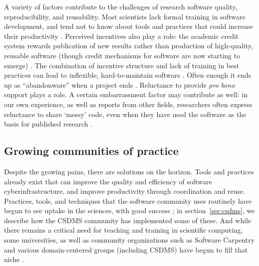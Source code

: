\documentclass[12pt]{amsart}
\begin{document}
A variety of factors contribute to the challenges of research software quality, reproducibility, and reusability. Most scientists lack formal training in software development, and tend not to know about tools and practices that could increase their productivity \citep{kelly2007software,basili2008understanding,faulk2009scientific,hannay2009scientists,hwang2017software,alnoamany2018towards,pinto2018scientists,kellogg2018role}. Perceived incentives also play a role: the academic credit system rewards publication of new results rather than production of high-quality, reusable software (though credit mechanisms for software are now starting to emerge) \citep{leveque2009python,howison2011scientific,morin2012shining,turk2013scaling,ahalt2014water,poisot2015best,hwang2017software,wiese2019naming}. The combination of incentive structure and lack of training in best practices can lead to inflexible, hard-to-maintain software \citep{brown2014run,johanson2018software}. Often enough it ends up as ``abandonware'' when a project ends \citep{barnes2010publish}. Reluctance to provide \textit{pro bono} support plays a role. A certain embarrassment factor may contribute as well: in our own experience, as well as reports from other fields, researchers often express reluctance to share `messy' code, even when they have used the software as the basis for published research \citep{barnes2010publish,morin2012shining,leveque2013top}.



\subsection{Growing communities of practice}

Despite the growing pains, there are solutions on the horizon. Tools and practices already exist that can improve the quality and efficiency of software cyberinfrastructure, and improve productivity through coordination and reuse. Practices, tools, and techniques that the software community uses routinely have begun to see uptake in the sciences, with good success \citep{bangerth2013makes,turk2013scaling,hastings2014ten,wilson2014best,brown2014run,poisot2015best,hwang2017software,nanthaamornphong2017test,scott2017esip,taschuk2017ten,wilson2017good,benureau2018re,bryan2018excuse,adorf2018professionally,lathrop2019introduction}; in section~\ref{sec:csdms}, we describe how the CSDMS community has implemented some of these. And while there remains a critical need for teaching and training in scientific computing, some universities, as well as community organizations such as Software Carpentry and various domain-centered groups (including CSDMS) have begun to fill that niche \citep[e.g.,][]{jacobs2016experiences}. 
\end{document}
